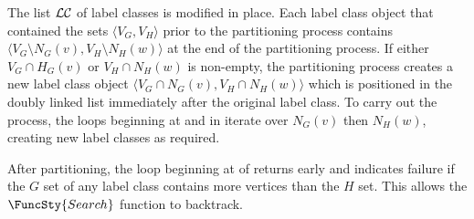 The list $\mathcal{LC}$ of label classes is modified in place.
Each label class object that contained the sets $\langle V_G, V_H \rangle$ prior
to the partitioning process contains $\langle V_G \setminus N_G(v), V_H \setminus N_H(w)\rangle$
at the end of the partitioning process.
If either $V_G \cap H_G(v)$ or $V_H \cap N_H(w)$
is non-empty, the partitioning process creates a new label class object
$\langle V_G \cap N_G(v), V_H \cap N_H(w)\rangle$ which is
positioned in the doubly linked list immediately after the original label class.
To carry out the process, the loops beginning
at  and 
in  iterate over $N_G(v)$ then $N_H(w)$,
creating new label classes as required.

After partitioning, the loop beginning at 
of  returns early and indicates failure if the $G$ set
of any label class contains more vertices than the $H$ set.  This allows the
$\FuncSty{Search}$ function to backtrack.


